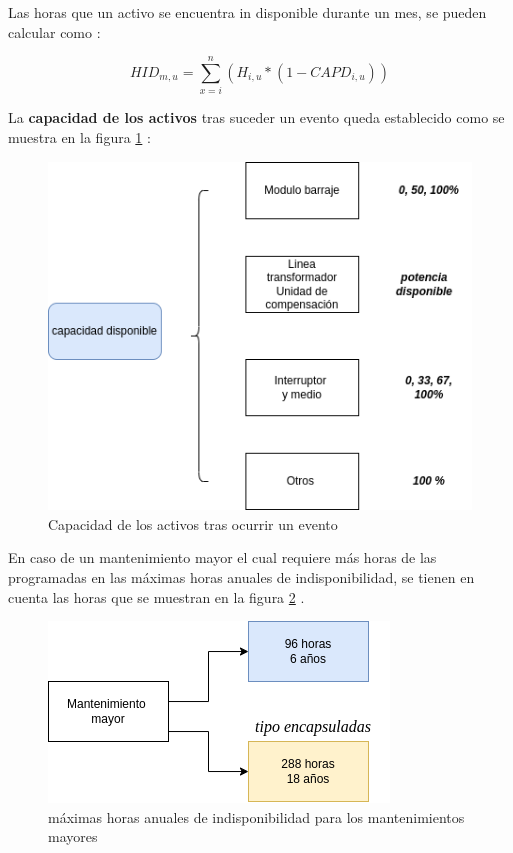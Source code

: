 \documentclass[a5paper]{book}%
\begin{document}
Las horas que un activo  se encuentra  in disponible durante un mes, se pueden calcular como \cite{CREG0152018}:

  \[ HID_{m,u} = \sum_{x=i}^{n}(H_{i,u}*(1-CAPD_{i,u}))  \]

    La \textbf{capacidad de los activos} tras suceder un evento queda establecido  como se muestra en la figura \ref{fig:capacidad} \cite{CREG0152018}:

    \begin{figure}[H]
      \centering
      \caption[capacidad]{Capacidad de los activos tras ocurrir un evento}
      \label{fig:capacidad}
      \includegraphics[width=\linewidth]{capacidad_eventos}
    \end{figure}

En caso de un mantenimiento mayor el cual requiere más horas de las programadas en las máximas horas anuales de indisponibilidad, se tienen en cuenta las horas que se muestran en la figura \ref{fig:mayor} \cite{CREG0152018}.

    \begin{figure}[H]
      \centering
      \caption{máximas horas anuales de indisponibilidad para los mantenimientos mayores}
      \label{fig:mayor}
      \includegraphics[width=\linewidth]{mantenimoento_mayor}
    \end{figure}
  
\end{document}
